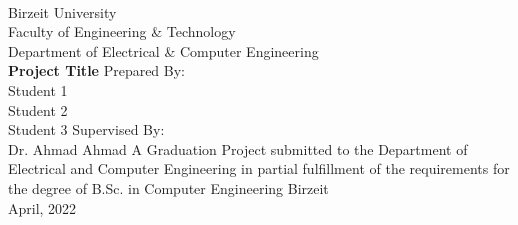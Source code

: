 \documentclass[12pt,a4paper]{report}
\def \LOGOPATH {assets/birzeit-logo.svg}
\def \UNIVERSITY {Birzeit University}
\def \FACULTY {Faculty of Engineering \& Technology}
\def \DEPARTEMENT {Department of Electrical \& Computer Engineering}
\def \PROJECTTITLE {Project Title}
\def \STUDENTA {Student 1}
\def \STUDENTB {Student 2}
\def \STUDENTC {Student 3}
\def \SUPERVISOR {Dr. Ahmad Ahmad}
\begin{document}
\setlength{\parindent}{0em}
\setlength{\parskip}{0.5em}


\begin{titlepage}
    \vfill
    \begin{center}
         \\
        \fontsize{14pt}{14pt}\selectfont
        \vfill
        \UNIVERSITY \\
        \FACULTY \\
        \DEPARTEMENT \\
        \vfill
        \fontsize{18pt}{18pt}\selectfont
        \textbf{\PROJECTTITLE}
        \vfill
        \fontsize{14pt}{14pt}\selectfont
        Prepared By: \\
        \STUDENTA \\
        \STUDENTB \\
        \STUDENTC
        \vfill
        Supervised By: \\
        \SUPERVISOR
        \vfill
        A Graduation Project submitted to the Department of Electrical and Computer Engineering in partial fulfillment of the requirements for the degree of B.Sc. in Computer Engineering
        \vfill
        Birzeit \\
        April, 2022
    \end{center}
\end{titlepage}

\dominitoc



\cleardoublepage {} {} \mtcaddchapter \tableofcontents

\cleardoublepage {} {} \mtcaddchapter \listoftables

\cleardoublepage {} {} \mtcaddchapter \listoffigures

\cleardoublepage

\setlength{\parindent}{0em}
\setlength{\parskip}{0.5em}














\cleardoublepage {} {} \mtcaddchapter


\end{document}
